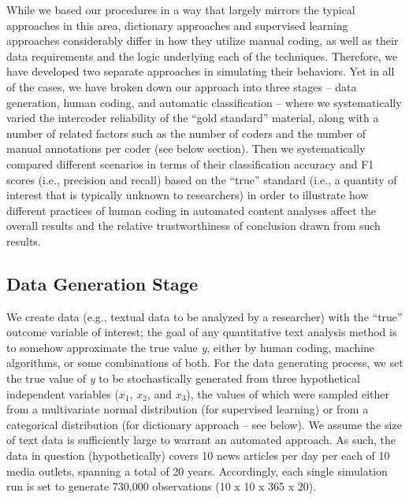 \documentclass[man, 12pt, a4paper, nolmodern, noextraspace]{apa6}
\begin{document}
    While we based our procedures in a way that largely mirrors the typical approaches in this area, dictionary approaches and supervised learning approaches considerably differ in how they utilize manual coding, as well as their data requirements and the logic underlying each of the techniques. Therefore, we have developed two separate approaches in simulating their behaviors. Yet in all of the cases, we have broken down our approach into three stages – data generation, human coding, and automatic classification – where we systematically varied the intercoder reliability of the “gold standard” material, along with a number of related factors such as the number of coders and the number of manual annotations per coder (see below section). Then we systematically compared different scenarios in terms of their classification accuracy and F1 scores (i.e., precision and recall) based on the \enquote{true} standard (i.e., a quantity of interest that is typically unknown to researchers) in order to illustrate how different practices of human coding in automated content analyses affect the overall results and the relative trustworthiness of conclusion drawn from such results.
    
    \subsection{Data Generation Stage}
    
    We create data (e.g., textual data to be analyzed by a researcher) with the \enquote{true} outcome variable of interest; the goal of any quantitative text analysis method is to somehow approximate the true value \textit{y}, either by human coding, machine algorithms, or some combinations of both. For the data generating process, we set the true value of \textit{y} to be stochastically generated from three hypothetical independent variables ($x_1$, $x_2$, and $x_3$), the values of which were sampled either from a multivariate normal distribution (for supervised learning) or from a categorical distribution (for dictionary approach -- see below). We assume the size of text data is sufficiently large to warrant an automated approach. As such, the data in question (hypothetically) covers 10 news articles per day per each of 10 media outlets, spanning a total of 20 years. Accordingly, each single simulation run is set to generate 730,000 observations (10 x 10 x 365 x 20).
    
\end{document}
